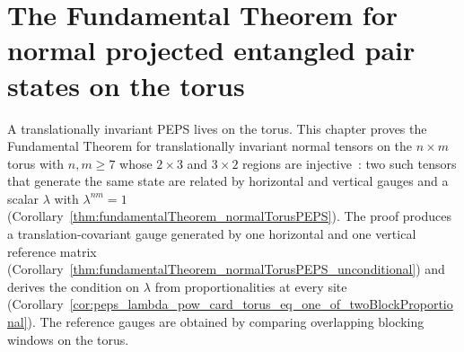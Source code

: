 \chapter{The Fundamental Theorem for normal projected entangled pair states on the torus}
\label{ch:peps_ft_normal_torus}

A translationally invariant PEPS lives on the torus. This chapter proves the
Fundamental Theorem for translationally invariant normal tensors on the
$n\times m$ torus with $n,m\ge 7$ whose $2\times 3$ and $3\times 2$ regions are
injective~\cite[Theorem~3]{Molnar2018NormalPEPS}: two such tensors that
generate the same state are related by horizontal and vertical gauges and a
scalar $\lambda$ with $\lambda^{nm}=1$
(Corollary~\ref{thm:fundamentalTheorem_normalTorusPEPS}). The proof produces a
translation-covariant gauge generated by one horizontal and one vertical
reference matrix
(Corollary~\ref{thm:fundamentalTheorem_normalTorusPEPS_unconditional}) and
derives the condition on $\lambda$ from proportionalities at every site
(Corollary~\ref{cor:peps_lambda_pow_card_torus_eq_one_of_twoBlockProportional}).
The reference gauges are obtained by comparing overlapping blocking windows on
the torus.



